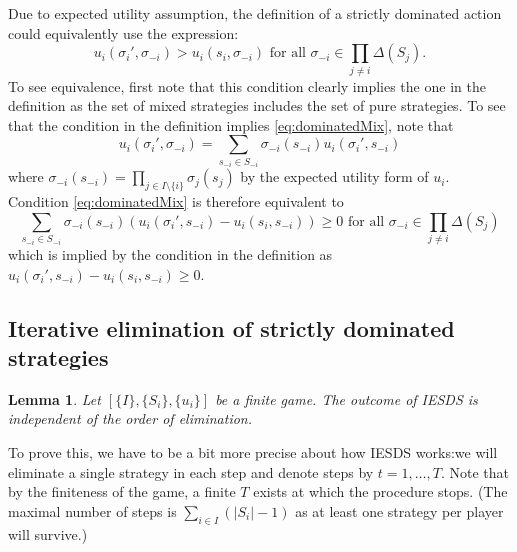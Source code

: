 \documentclass[a4paper,11pt]{article}
\newtheorem{lemma}{Lemma}
\begin{document}
Due to expected utility assumption, the definition of a strictly dominated action could equivalently use the expression:
\begin{equation}
u_i(\sigma_i',\sigma_{-i})>u_i(s_i,\sigma_{-i}) \text{ for all }\sigma_{-i}\in\prod_{j\neq i}\Delta(S_j).\label{eq:dominatedMix}
\end{equation}
To see equivalence, first note that this condition clearly implies the one in the definition as the set of mixed strategies includes the set of pure strategies. To see that the condition in the definition implies \eqref{eq:dominatedMix}, note that
\begin{equation*}
  u_i(\sigma_i',\sigma_{-i})= \sum_{s_{-i}\in S_{-i}}\sigma_{-i}(s_{-i})  u_i(\sigma_i',s_{-i})
\end{equation*}
where $\sigma_{-i}(s_{-i})=\prod_{j\in I\setminus\{i\}}\sigma_j(s_j)$ by the expected utility form of $u_i$. Condition \eqref{eq:dominatedMix} is therefore equivalent to
\begin{equation*}
  \sum_{s_{-i}\in S_{-i}}\sigma_{-i}(s_{-i})  \left(u_i(\sigma_i',s_{-i})-u_i(s_i,s_{-i})\right)\geq 0 \text{ for all }\sigma_{-i}\in\prod_{j\neq i}\Delta(S_j)
\end{equation*}
which is implied by the condition in the definition as $u_i(\sigma_i',s_{-i})-u_i(s_i,s_{-i})\geq 0$.

\subsection{Iterative elimination of strictly dominated strategies}
\label{sec:iesds}

\begin{lemma}\label{lem:iesdsOrder}
  Let $\left[\{I\},\{S_i\},\{u_i\}\right]$ be a finite game. The outcome of IESDS is independent of the order of elimination.
\end{lemma}

To prove this, we have to be a bit more precise about how IESDS works:we will eliminate a single strategy in each step and denote steps by $t=1,\dots,T$. Note that by the finiteness of the game, a finite $T$ exists at which the procedure stops. (The maximal number of steps is $\sum_{i\in I}(|S_i|-1)$ as at least one strategy per player will survive.)

\end{document}

